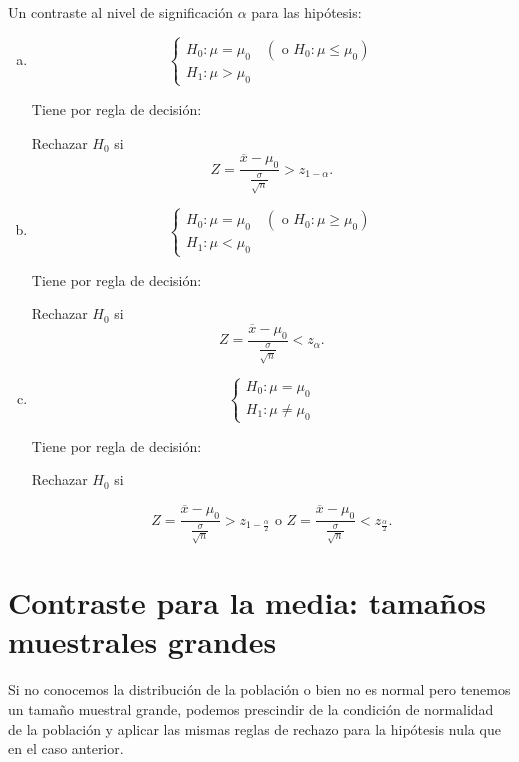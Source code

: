 \documentclass[12pt]{report}
\begin{document}
    Un contraste al nivel de significación $\alpha$ para las
    hipótesis:
\begin{enumerate}[a)]
\item  $$\left\{\begin{array}{l}
    H_{0}:\mu=\mu_{0} \quad (\mbox{ o } H_{0}:\mu\leq \mu_{0})\\
    H_{1}:\mu>\mu_{0}
    \end{array}\right.$$


    Tiene por regla de decisión:

    Rechazar $H_{0}$ si
    $$Z=
    \frac{\overline{x}-\mu_{0}}{\frac{\sigma}{\sqrt{n}}}>z_{1-\alpha}.$$

 \item  $$\left\{\begin{array}{l}
    H_{0}:\mu=\mu_{0} \quad (\mbox{ o } H_{0}:\mu\geq \mu_{0})\\
    H_{1}:\mu<\mu_{0}
    \end{array}\right.$$


    Tiene por regla de decisión:

    Rechazar $H_{0}$ si
    $$Z=
    \frac{\overline{x}-\mu_{0}}{\frac{\sigma}{\sqrt{n}}}<z_{\alpha}.$$

\item  $$\left\{\begin{array}{l}
    H_{0}:\mu=\mu_{0} \\
    H_{1}:\mu\not=\mu_{0}
    \end{array}\right.$$


    Tiene por regla de decisión:

    Rechazar $H_{0}$ si

    $$Z=
    \frac{\overline{x}-\mu_{0}}
    {\frac{\sigma}{\sqrt{n}}}>z_{1-\frac{\alpha}{2}}\mbox{ o }  Z=
    \frac{\overline{x}-\mu_{0}}
    {\frac{\sigma}{\sqrt{n}}}<z_{\frac{\alpha}{2}}.$$
\end{enumerate}

\section{Contraste para la media: tamaños muestrales grandes}

    Si no conocemos la distribución de la población o bien no es normal
    pero tenemos un tamaño muestral grande, podemos prescindir de la
    condición de normalidad de la población y aplicar las mismas
    reglas de rechazo para la hipótesis nula que en el caso anterior.
\end{document}
